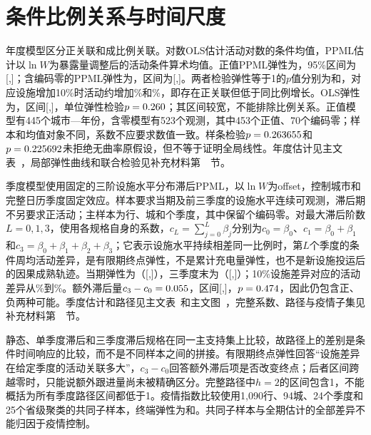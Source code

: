 \section*{条件比例关系与时间尺度}
年度模型区分正关联和成比例关联。对数OLS估计活动对数的条件均值，PPML估计以$\ln W$为暴露量调整后的活动条件算术均值。正值PPML弹性为\AnnualPosBeta{}，95\%区间为[\AnnualPosLow{},\AnnualPosHigh{}]；含编码零的PPML弹性为\AnnualZeroBeta{}，区间为[\AnnualZeroLow{},\AnnualZeroHigh{}]。两者检验弹性等于1的$p$值分别为\AnnualPosPOne{}和\AnnualZeroPOne{}，对应设施增加10\%时活动约增加\AnnualPosTen\%和\AnnualZeroTen\%，即存在正关联但低于同比例增长。OLS弹性为\AnnualOLSBeta{}，区间[\AnnualOLSLow{},\AnnualOLSHigh{}]，单位弹性检验$p=0.260{}$；其区间较宽，不能排除比例关系。正值模型有445个城市—年份，含零模型有523个观测，其中453个正值、70个编码零；样本和均值对象不同，系数不应要求数值一致。样条检验$p=0.263655$和$p=0.225692$未拒绝无曲率原假设，但不等于证明全局线性。年度估计见主文表~，局部弹性曲线和联合检验见补充材料第~~节。

季度模型使用固定的三阶设施水平分布滞后PPML，以$\ln W$为offset，控制城市和完整日历季度固定效应。样本要求当期及前三季度的设施水平连续可观测，滞后期不另要求正活动；主样本为\DynamicRows{}行、\DynamicCities{}城和\DynamicQuarters{}个季度，其中保留\DynamicZeroRows{}个编码零。对最大滞后阶数$L=0,1,3$，使用各规格自身的系数，$c_L=\sum_{j=0}^{L}\beta_j$分别为$c_0=\beta_0$、$c_1=\beta_0+\beta_1$和$c_3=\beta_0+\beta_1+\beta_2+\beta_3$；它表示设施水平持续相差同一比例时，第$L$个季度的条件周均活动差异，是有限期终点弹性，不是累计充电量弹性，也不是新设施投运后的因果成熟轨迹。当期弹性为\DynamicNow{}（[\DynamicNowLow{},\DynamicNowHigh{}]），三季度末为\DynamicEnd{}（[\DynamicEndLow{},\DynamicEndHigh{}]）；10\%设施差异对应的活动差异从\DynamicNowTen\%到\DynamicEndTen\%。额外滞后量$c_3-c_0=0.055{}$，区间[\DynamicExtraLow{},\DynamicExtraHigh{}]，$p=0.474{}$，因此仍包含正、负两种可能。季度估计和路径见主文表~和主文图~，完整系数、路径与疫情子集见补充材料第~~节。

静态、单季度滞后和三季度滞后规格在同一主支持集上比较，故路径上的差别是条件时间响应的比较，而不是不同样本之间的拼接。有限期终点弹性回答“设施差异在给定季度的活动关联多大”，$c_3-c_0$回答额外滞后项是否改变终点；后者区间跨越零时，只能说额外跟进量尚未被精确区分。完整路径中$h=2$的区间包含1，不能概括为所有季度路径区间都低于1。疫情指数比较使用1,090行、94城、24个季度和25个省级聚类的共同子样本，终端弹性为\CovidBase{}和\CovidAdjusted{}。共同子样本与全期估计的全部差异不能归因于疫情控制。

